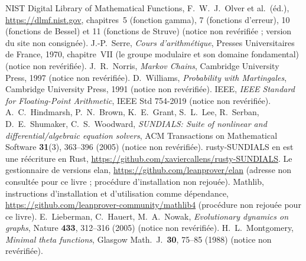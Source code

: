  NIST Digital Library of Mathematical Functions, F.~W.~J.~Olver et al.\ (éd.),
\url{https://dlmf.nist.gov}, chapitres~5 (fonction gamma), 7 (fonctions d'erreur), 10 (fonctions de Bessel) et 11
(fonctions de Struve) (notice non revérifiée ; version du site non consignée).
 J.-P.~Serre, \emph{Cours d'arithmétique}, Presses Universitaires de France, 1970, chapitre~VII
(le groupe modulaire et son domaine fondamental) (notice non revérifiée).
 J.~R.~Norris, \emph{Markov Chains}, Cambridge University Press, 1997 (notice non revérifiée).
 D.~Williams, \emph{Probability with Martingales}, Cambridge University Press, 1991 (notice non
revérifiée).
 IEEE, \emph{IEEE Standard for Floating-Point Arithmetic}, IEEE Std 754-2019 (notice non
revérifiée).
 A.~C.~Hindmarsh, P.~N.~Brown, K.~E.~Grant, S.~L.~Lee, R.~Serban, D.~E.~Shumaker,
C.~S.~Woodward, \emph{SUNDIALS: Suite of nonlinear and differential/algebraic equation solvers}, ACM Transactions on
Mathematical Software \textbf{31}(3), 363--396 (2005) (notice non revérifiée). rusty-SUNDIALS en est une réécriture en
Rust, \url{https://github.com/xaviercallens/rusty-SUNDIALS}.
 Le gestionnaire de versions elan, \url{https://github.com/leanprover/elan} (adresse non consultée
pour ce livre ; procédure d'installation non rejouée).
 Mathlib, instructions d'installation et d'utilisation comme dépendance,
\url{https://github.com/leanprover-community/mathlib4} (procédure non rejouée pour ce livre).
 E.~Lieberman, C.~Hauert, M.~A.~Nowak, \emph{Evolutionary dynamics on graphs}, Nature
\textbf{433}, 312--316 (2005) (notice non revérifiée).
 H.~L.~Montgomery, \emph{Minimal theta functions}, Glasgow Math.\ J.\ \textbf{30},
75--85 (1988) (notice non revérifiée).
